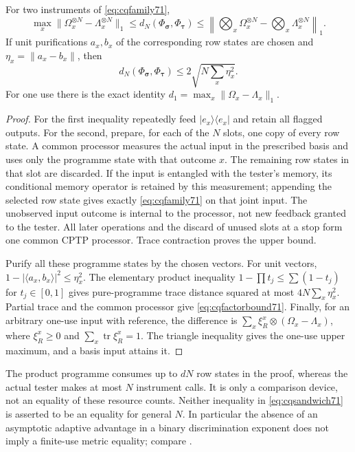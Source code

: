 \begin{lemma}\label{lem:cqmetric71}
For two instruments of \eqref{eq:cqfamily71},
\begin{equation}\label{eq:cqsandwich71}
 \max_x\|\Omega_x^{\otimes N}-\Lambda_x^{\otimes N}\|_1
 \le d_N(\Phi_{\boldsymbol\sigma},\Phi_{\boldsymbol\tau})
 \le\left\|\bigotimes_x\Omega_x^{\otimes N}
               -\bigotimes_x\Lambda_x^{\otimes N}\right\|_1.
\end{equation}
If unit purifications $a_x,b_x$ of the corresponding row states are
chosen and $\eta_x=\|a_x-b_x\|$, then
\begin{equation}\label{eq:cqfactorbound71}
 d_N(\Phi_{\boldsymbol\sigma},\Phi_{\boldsymbol\tau})
                  \le2\sqrt{N\sum_x\eta_x^2}.
\end{equation}
For one use there is the exact identity
$d_1=\max_x\|\Omega_x-\Lambda_x\|_1$.
\end{lemma}
\begin{proof}
For the first inequality repeatedly feed $|e_x\rangle\langle e_x|$
and retain all flagged outputs. For the second, prepare, for each
of the $N$ slots, one copy of every row state. A common processor
measures the actual input in the prescribed basis and uses only the
programme state with that outcome $x$. The remaining row states in
that slot are discarded. If the input is entangled with the tester's
memory, its conditional memory operator is retained by this measurement;
appending the selected row state gives exactly
\eqref{eq:cqfamily71} on that joint input. The unobserved input outcome
is internal to the processor, not new feedback granted to the tester.
All later operations and the discard of unused slots at a stop form one
common CPTP processor. Trace contraction proves the upper bound.

Purify all these programme states by the chosen vectors. For unit
vectors, $1-|\langle a_x,b_x\rangle|^2\le\eta_x^2$. The elementary
product inequality $1-\prod t_j\le\sum(1-t_j)$ for $t_j\in[0,1]$
gives pure-programme trace distance squared at most
$4N\sum_x\eta_x^2$. Partial trace and the common processor give
\eqref{eq:cqfactorbound71}. Finally, for an arbitrary one-use input
with reference, the difference is
$\sum_x\xi_R^x\otimes(\Omega_x-\Lambda_x)$, where
$\xi_R^x\ge0$ and $\sum_x\operatorname{tr}\xi_R^x=1$.
The triangle inequality gives the one-use upper maximum, and a basis
input attains it.
\end{proof}
The product programme consumes up to $dN$ row states in the proof,
whereas the actual tester makes at most $N$ instrument calls. It is
only a comparison device, not an equality of these resource counts.
Neither inequality in \eqref{eq:cqsandwich71} is asserted to be an
equality for general $N$. In particular the absence of an asymptotic
adaptive advantage in a binary discrimination exponent does not imply
a finite-use metric equality; compare \cite[Sections~II and V]{SHW68}.

